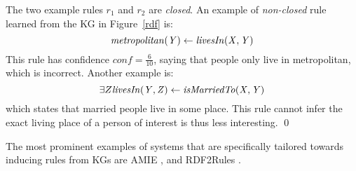\begin{example}
The two example rules $r_1$ and $r_2$ are \textit{closed}. An example of \textit{non-closed} rule learned from the KG in Figure~\ref{rdf} is:
\[\mathit{metropolitan(Y)} \leftarrow \mathit{livesIn(X,Y)} \]
This rule has confidence $conf = \frac{6}{10}$, saying that people only live in metropolitan, which is incorrect. Another example is:
\[\exists Z \mathit{livesIn(Y,Z)} \leftarrow \mathit{isMarriedTo(X,Y)} \]  which states that married people 
live in some place. This rule cannot infer the exact living place of a person of interest is thus less interesting. \qed%
\end{example}

The most prominent examples of systems that are specifically tailored towards inducing rules from KGs are AMIE \cite{amie}, %
and RDF2Rules \cite{rdf2rules}.
